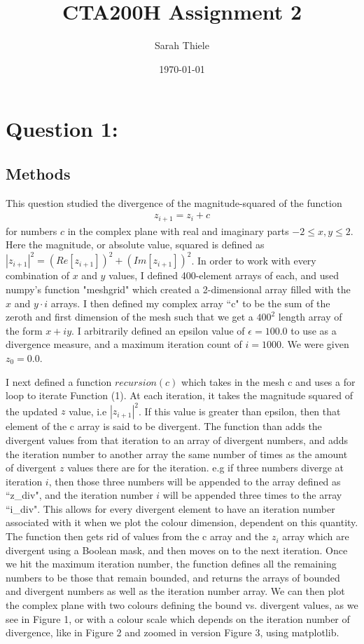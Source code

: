 \documentclass[12pt]{article}
\title{CTA200H Assignment 2}
\author{Sarah Thiele}
\date{\today}
\begin{document}
\maketitle

\section{Question 1:}
\subsection{Methods}
This question studied the divergence of the magnitude-squared of the function 
\begin{align}
    z_{i+1}=z_i + c
\end{align} 
for numbers $c$ in the complex plane with real and imaginary parts $-2 \leq x,y \leq 2$. Here the magnitude, or absolute value, squared is defined as $|z_{i+1}|^2=(Re[z_{i+1}])^2+(Im[z_{i+1}])^2$. In order to work with every combination of $x$ and $y$ values, I defined 400-element arrays of each, and used numpy's function "meshgrid" which created a 2-dimensional array filled with the $x$ and $y\cdot i$ arrays. I then defined my complex array ``c" to be the sum of the zeroth and first dimension of the mesh such that we get a $400^2$ length array of the form $x+iy$. I arbitrarily defined an epsilon value of $\epsilon=100.0$ to use as a divergence measure, and a maximum iteration count of $i=1000$. We were given $z_0 = 0.0$. 

I next defined a function $recursion(c)$ which takes in the mesh c and uses a for loop to iterate Function (1). At each iteration, it takes the magnitude squared of the updated $z$ value, i.e $|z_{i+1}|^2$. If this value is greater than epsilon, then that element of the c array is said to be divergent. The function than adds the divergent values from that iteration to an array of divergent numbers, and adds the iteration number to another array the same number of times as the amount of divergent $z$ values there are for the iteration. e.g if three numbers diverge at iteration $i$, then those three numbers will be appended to the array defined as ``z\_div", and the iteration number $i$ will be appended three times to the array ``i\_div". This allows for every divergent element to have an iteration number associated with it when we plot the colour dimension, dependent on this quantity. The function then gets rid of values from the c array and the $z_i$ array which are divergent using a Boolean mask, and then moves on to the next iteration. Once we hit the maximum iteration number, the function defines all the remaining numbers to be those that remain bounded, and returns the arrays of bounded and divergent numbers as well as the iteration number array. We can then plot the complex plane with two colours defining the bound vs. divergent values, as we see in Figure 1, or with a colour scale which depends on the iteration number of divergence, like in Figure 2 and zoomed in version Figure 3, using matplotlib.
\end{document}
